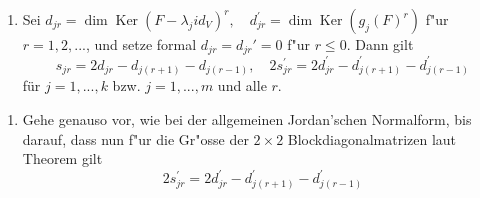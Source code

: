 \documentclass[8pt, a4paper, twocolumn, landscape]{article}
\newcommand{\comment}[1]{}
\begin{document}
\begin{theorem}
\begin{enumerate}
{$$\begin{array}{cccc}
& \ddots & \\ & J_{r_{k}}\left(\lambda_{k}\right)^{\oplus s_{k r_{k}}} & \\ 
& J_{1}\left(A_{1}\right)^{\oplus s_{11}^{\prime}} & J_{2}\left(A_{1}\right)^{\oplus s_{12}} & \\ 
& \ddots & J_{q_{1}}\left(A_{1}\right)^{\oplus s_{i q_{1}}} & J_{1}\left(A_{2}\right)^{\oplus s_{2 q_{1}}} \\ 
& & \ddots & J_{q_{m}}\left(A_{m}\right)^{\oplus s_{m, n}}
\end{array}\right)
$$
mit $A_j = \left(\begin{array}{cc}a_{j} & b_{j} \\ -b_{j} & a_{j}\end{array}\right)$, $\mu_j = a_j + i b_j$ wie vorher
}
\item Sei 
$
d_{j r}= \operatorname{dim} \operatorname{Ker}\left(F-\lambda_{j} i d_{V}\right)^{r}, \quad 
d_{j r}^{\prime}=\operatorname{dim} \operatorname{Ker}\left(g_{j}(F)^{r}\right)
$
f"ur $r = 1, 2, ...$, und setze formal $d_{jr} = d_{jr}' = 0$ f"ur $r \leq 0$. Dann gilt
$$
s_{jr}=2 d_{j r}-d_{j(r+1)}-d_{j(r-1)}, \quad 2 s_{j r}^{\prime}=2 d_{j r}^{\prime}-d_{j(r+1)}^{\prime}-d_{j(r-1)}^{\prime}
$$
für $j=1, ..., k$ bzw. $j=1, ..., m$ und alle $r$.
\comment{
\item Das Minimalpolynom ist 
$$
M_F(t) = (t - \lambda_1)^{l_1} ... (t - \lambda_k)^{l_k} g_1^{l'_1} ... g_m^{l'_m}
$$
mit $l_j$ bzw. $l_j'$ den gr"ossten Indizes mit $s_{jl_j}\neq 0$ bzw. $s_{jl_j'}' \neq 0$.
}
\end{enumerate}
\end{theorem}



\begin{remark} 
\begin{enumerate}
\item Gehe genauso vor, wie bei der allgemeinen Jordan'schen Normalform, bis darauf, dass nun f"ur die Gr"osse der $2\times 2$ Blockdiagonalmatrizen laut Theorem gilt
$$
2s_{j r}^{\prime}=2 d_{j r}^{\prime}-d_{j(r+1)}^{\prime}-d_{j(r-1)}^{\prime}
$$
\end{enumerate}
\end{remark}
\end{document}
